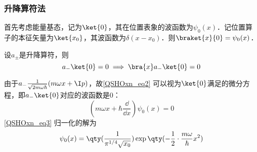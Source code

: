 
\subsubsection{升降算符法}

首先考虑能量基态，记为$\ket{0}$，其在位置表象的波函数为$\psi_0(x)$．记位置算子的本征矢量为$\ket{x_0}$，其波函数为$\delta(x-x_0)$．则$\braket{x}{0}=\psi_0(x)$．

设$a_{\pm}$是升降算符，则
\begin{equation}\label{QSHOxn_eq2}
a_-\ket{0}=0 \implies \bra{x}a_-\ket{0}=0
\end{equation}

由于$a_-\frac{1}{\sqrt{2m\omega\hbar}} (m\omega x + \I p)$，故\autoref{QSHOxn_eq2} 可以视为$\ket{0}$满足的微分方程，即$a_-\ket{0}$对应的波函数是$0$：
\begin{equation}\label{QSHOxn_eq3}
(m\omega x + \hbar\frac{\dd}{\dd x}) \psi_0(x) = 0
\end{equation}
\autoref{QSHOxn_eq3} 归一化的解为
\begin{equation}
\psi_0(x)=\qty(\frac{1}{\pi^{1/4}\sqrt{x_0}})\exp\qty(-\frac{1}{2}\cdot\frac{m\omega}{\hbar}x^2)
\end{equation}














